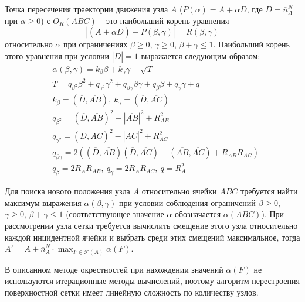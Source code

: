 \documentclass[a4paper,14pt]{extarticle}                     %
\theoremstyle{plain}                                         %
\begin{document}
Точка пересечения траектории движения узла $A$ ($\overline{P}(\alpha) = \overline{A} + \alpha \overline{D}$, где $\overline{D} = \overline{n}_A^N$ при $\alpha \ge 0$) с $O_R(ABC)$ -- это наибольший корень уравнения
\begin{equation*}
|(\overline{A} + \alpha \overline{D}) - \overline{P}(\beta, \gamma)| = R(\beta, \gamma)
\end{equation*}
относительно $\alpha$ при ограничениях $\beta \ge 0$, $\gamma \ge 0$, $\beta + \gamma \le 1$.
Наибольший корень этого уравнения при условии $|\overline{D}| = 1$ выражается следующим образом:
\begin{equation*}
	\begin{aligned}
		& \alpha(\beta, \gamma) = k_{\beta} \beta + k_{\gamma} \gamma + \sqrt{T} \\
		& T = q_{\beta^2} \beta^2 + q_{\gamma^2} \gamma^2 + q_{\beta \gamma} \beta \gamma + q_{\beta} \beta + q_{\gamma} \gamma + q \\
		& k_{\beta} = (\overline{D}, \overline{AB}), \ k_{\gamma} = (\overline{D}, \overline{AC}) \\
		& q_{\beta^2} = (\overline{D}, \overline{AB})^2 - |\overline{AB}|^2 + R_{AB}^2 \\
		& q_{\gamma^2} = (\overline{D}, \overline{AC})^2 - |\overline{AC}|^2 + R_{AC}^2 \\
		& q_{\beta \gamma} = 2 \left( (\overline{D}, \overline{AB}) (\overline{D}, \overline{AC}) - (\overline{AB}, \overline{AC}) + R_{AB}R_{AC} \right) \\
		& q_{\beta} = 2 R_A R_{AB}, \ q_{\gamma} = 2 R_A R_{AC}, \ q = R_A^2
	\end{aligned}
\end{equation*}

Для поиска нового положения узла $A$ относительно ячейки $ABC$ требуется найти максимум выражения $\alpha(\beta, \gamma)$ при условии соблюдения ограничений $\beta \ge 0$, $\gamma \ge 0$, $\beta + \gamma \le 1$ (соответствующее значение $\alpha$ обозначается $\alpha(ABC)$).
При рассмотрении узла сетки требуется вычислить смещение этого узла относительно каждой инцидентной ячейки и выбрать среди этих смещений максимальное, тогда $\overline{A}' = \overline{A} + \overline{n}_A^N \cdot \max_{F \in \mathscr{F}(A)}{\alpha(F)}$.

В описанном методе окрестностей при нахождении значений $\alpha(F)$ не используются итерационные методы вычислений, поэтому алгоритм перестроения поверхностной сетки имеет линейную сложность по количеству узлов.
\end{document}
